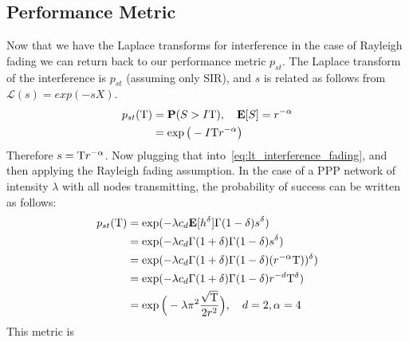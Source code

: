 \subsection{Performance Metric}
%
Now that we have the Laplace transforms for interference in the case of Rayleigh fading we can return back to our performance metric $p_{st}$.  The Laplace transform of the interference is $p_{st}$ (assuming only SIR), and $s$ is related as follows from $\mathcal{L}(s)=exp(-sX)$.
%
\begin{equation}
  \begin{split}
    p_{st}(\mathrm{T}) &= \textbf{P} (S>I \mathrm{T}), \quad \textbf{E}[S] = r^{-\alpha} \\
    &= \exp \big( -I \mathrm{T} r^{-\alpha} \big)
  \end{split}
\end{equation}
%
Therefore $s = \mathrm{T} r^{-\alpha}$.  Now plugging that into~\eqref{eq:lt_interference_fading}, and then applying the Rayleigh fading assumption.  In the case of a PPP network of intensity $\lambda$ with all nodes transmitting, the probability of success can be written as follows:
%
\begin{equation}
  \begin{split}
        p_{st}(\mathrm{T}) &= \exp(-\lambda c_d \textbf{E}[h^\delta] \Gamma(1-\delta)s^\delta) \\
        &= \exp(-\lambda c_d \Gamma(1+\delta) \Gamma(1-\delta)s^\delta) \\
        &= \exp(-\lambda c_d \Gamma(1+\delta) \Gamma(1-\delta)(r^{-\alpha} \mathrm{T}))^\delta) \\
        &= \exp(-\lambda c_d \Gamma(1+\delta) \Gamma(1-\delta) r^{-d} \mathrm{T}^\delta) \\
    &= \exp \Big( -\lambda \pi^2 \frac{\sqrt{\mathrm{T}}}{2 r^2}  \Big),\quad d=2,\alpha=4
  \end{split}
\end{equation}
%
This metric is
